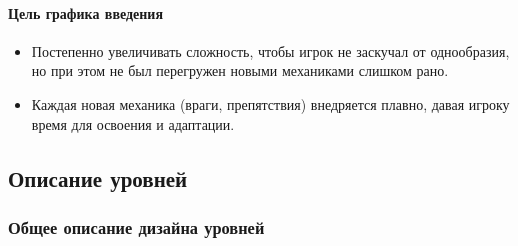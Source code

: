 \documentclass{article}
\begin{document}
\paragraph{Цель графика введения}
\begin{itemize}
    \item Постепенно увеличивать сложность, чтобы игрок не заскучал от однообразия, но при этом не был перегружен новыми механиками слишком рано.
    \item Каждая новая механика (враги, препятствия) внедряется плавно, давая игроку время для освоения и адаптации.
\end{itemize}
\subsection{Описание уровней}
\subsubsection{Общее описание дизайна уровней}
\end{document}
